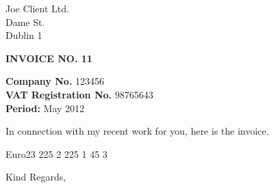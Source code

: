 \documentclass{letter}
\date{23. May 2013}
\begin{document}
\longindentation=0pt
  \begin{letter}{Joe Client Ltd. \\ Dame St. \\ Dublin 1}
\centerline{\bf \sc INVOICE NO. 11} \par    
\opening{\textbf{Company No.} 123456 
		\\ \textbf{VAT Registration No.} 98765643 
		\\ \textbf{Period:} May 2012 }
    In connection with my recent work for you, here is the invoice.
    \begin{invoice}{Euro}{23}  %
       {225} {2}
       {225} {1}
       {45} {3}
    \end{invoice}
    \closing{Kind Regards,}
  \end{letter}
\end{document}
